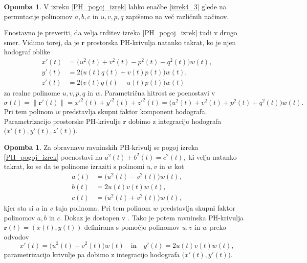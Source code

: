 \documentclass[12pt,a4paper,twoside]{article}
\theoremstyle{definition} %
\newtheorem{opomba}[definicija]{Opomba}
\theoremstyle{plain} %
\theoremstyle{primerstyle}
\numberwithin{equation}{section}  %
\newcommand{\rV}{\mathbf{r}}
\begin{document}
\begin{opomba}
	\label{opomba_PH_pogoj_izrek}
	V izreku \ref{PH_pogoj_izrek} lahko enačbe \eqref{izrek4_3} glede na permutacije polinomov $a,b,c$ in $u,v,p,q$ zapišemo na več različnih načinov.
\end{opomba}
Enostavno je preveriti, da velja trditev izreka \ref{PH_pogoj_izrek} tudi v drugo smer. Vidimo torej, da je $\rV$ prostorska PH-krivulja natanko takrat, ko je njen hodograf oblike
	\begin{align}
		x'(t)&=\big(u^2(t)+v^2(t)-p^2(t)-q^2(t)\big)w(t), \nonumber \\
		y'(t)&=2\big(u(t)q(t)+v(t)p(t)\big)w(t), \label{eq4_7} \\
		z'(t)&=2\big(v(t)q(t)-u(t)p(t)\big)w(t) \nonumber
	\end{align}
	za realne polinome $u,v,p,q$ in $w.$ Parametrična hitrost se poenostavi v
	\begin{equation}
		\label{eq4_8}
		\sigma(t)=\lVert\rV'(t)\rVert=x'^2(t)+y'^2(t)+z'^2(t)=\big(u^2(t)+v^2(t)+p^2(t)+q^2(t)\big)w(t).
	\end{equation}
	Pri tem polinom $w$ predstavlja skupni faktor komponent hodografa. Parametrizacijo prostorske PH-krivulje $\rV$ dobimo z integracijo hodografa $\big(x'(t),y'(t),z'(t)\big).$
\begin{opomba}
	\label{opomba1}
	Za obravnavo ravninskih PH-krivulj se pogoj izreka \ref{PH_pogoj_izrek} poenostavi na $a^2(t)+b^2(t)=c^2(t),$ ki velja natanko takrat, ko se da te polinome izraziti s polinomi $u,v$ in $w$ kot
	\begin{align}
		a(t)&=\big(u^2(t)-v^2(t)\big)w(t),\nonumber\\
		b(t)&=2u(t)v(t)w(t),\label{ravninska_PH}\\
		c(t)&=\big(u^2(t)+v^2(t)\big)w(t),\nonumber
	\end{align}
	kjer sta si $u$ in $v$ tuja polinoma. Pri tem polinom $w$ predstavlja skupni faktor polinomov $a,b$ in $c.$ Dokaz je dostopen v \cite[str.\ 382]{farouki2008pythagorean}. Tako je potem ravninska PH-krivulja $\rV(t)=(x(t),y(t))$ definirana s pomočjo polinomov $u,v$ in $w$ preko odvodov
	\begin{equation}
		\label{poly_ravninska_PH}
		x'(t)=\big(u^2(t)-v^2(t)\big)w(t)\quad\text{in}\quad y'(t)=2u(t)v(t)w(t),
	\end{equation}
	parametrizacijo krivulje pa dobimo z integracijo hodografa $\big(x'(t),y'(t)\big).$
\end{opomba}
\end{document}
